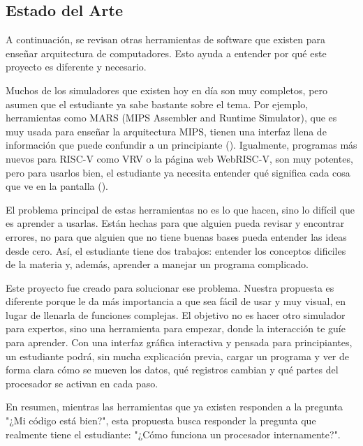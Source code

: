 \documentclass[12pt, letterpaper]{article}
\begin{document}
\subsection{Estado del Arte}
A continuación, se revisan otras herramientas de software que existen para enseñar arquitectura de computadores. Esto ayuda a entender por qué este proyecto es diferente y necesario.

Muchos de los simuladores que existen hoy en día son muy completos, pero asumen que el estudiante ya sabe bastante sobre el tema. Por ejemplo, herramientas como MARS (MIPS Assembler and Runtime Simulator), que es muy usada para enseñar la arquitectura MIPS, tienen una interfaz llena de información que puede confundir a un principiante (\cite{vollmar2007}). Igualmente, programas más nuevos para RISC-V como VRV o la página web WebRISC-V, son muy potentes, pero para usarlos bien, el estudiante ya necesita entender qué significa cada cosa que ve en la pantalla (\cite{giorgi2019}).

El problema principal de estas herramientas no es lo que hacen, sino lo difícil que es aprender a usarlas. Están hechas para que alguien pueda revisar y encontrar errores, no para que alguien que no tiene buenas bases pueda entender las ideas desde cero. Así, el estudiante tiene dos trabajos: entender los conceptos dificiles de la materia y, además, aprender a manejar un programa complicado.

Este proyecto fue creado para solucionar ese problema. Nuestra propuesta es diferente porque le da más importancia a que sea fácil de usar y muy visual, en lugar de llenarla de funciones complejas. El objetivo no es hacer otro simulador para expertos, sino una herramienta para empezar, donde la interacción te guíe para aprender. Con una interfaz gráfica interactiva y pensada para principiantes, un estudiante podrá, sin mucha explicación previa, cargar un programa y ver de forma clara cómo se mueven los datos, qué registros cambian y qué partes del procesador se activan en cada paso.

En resumen, mientras las herramientas que ya existen responden a la pregunta "¿Mi código está bien?", esta propuesta busca responder la pregunta que realmente tiene el estudiante: "¿Cómo funciona un procesador internamente?".
\end{document}

